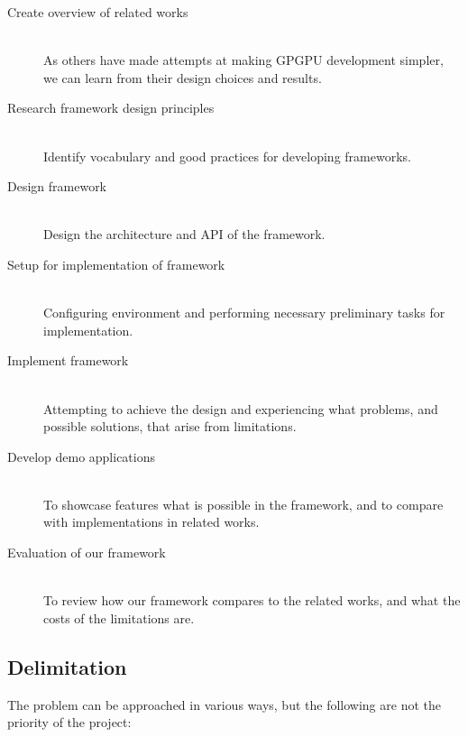 \begin{description}
\item[Create overview of related works] \hfill \\
As others have made attempts at making GPGPU development simpler, we can learn from their design choices and results.
\item[Research framework design principles] \hfill \\
Identify vocabulary and good practices for developing frameworks.
\item[Design framework] \hfill \\
Design the architecture and API of the framework.
\item[Setup for implementation of framework] \hfill \\
Configuring environment and performing necessary preliminary tasks for implementation.
\item[Implement framework] \hfill \\
Attempting to achieve the design and experiencing what problems, and possible solutions, that arise from limitations.
\item[Develop demo applications] \hfill \\
To showcase features what is possible in the framework, and to compare with implementations in related works.
\item[Evaluation of our framework] \hfill \\
To review how our framework compares to the related works, and what the costs of the limitations are.
\end{description}

\subsection{Delimitation}
The problem can be approached in various ways, but the following are not the priority of the project:


